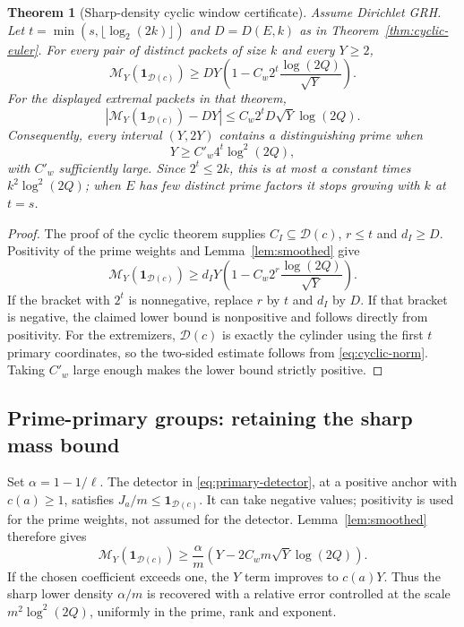 \documentclass[11pt]{article}
\newtheorem{theorem}{Theorem}[section]
\theoremstyle{definition}
\theoremstyle{remark}
\newcommand{\one}{\mathbf1}
\begin{document}
\begin{theorem}[Sharp-density cyclic window certificate]\label{thm:cyclic-window}
Assume Dirichlet GRH. Let $t=\min(s,\lfloor\log_2(2k)\rfloor)$ and $D=D(E,k)$ as in Theorem~\ref{thm:cyclic-euler}. For every pair of distinct packets of size $k$ and every $Y\ge2$,
\[
 \mathcal M_Y(\one_{\mathcal D(c)})
 \ge D Y\left(1-C_w2^t\frac{\log(2Q)}{\sqrt Y}\right).
\]
For the displayed extremal packets in that theorem,
\[
 \left|\mathcal M_Y(\one_{\mathcal D(c)})-DY\right|
 \le C_w2^tD\sqrt Y\log(2Q).
\]
Consequently, every interval $(Y,2Y)$ contains a distinguishing prime when
\[
 Y\ge C'_w4^t\log^2(2Q),
\]
with $C'_w$ sufficiently large. Since $2^t\le2k$, this is at most a constant times $k^2\log^2(2Q)$; when $E$ has few distinct prime factors it stops growing with $k$ at $t=s$.
\end{theorem}
\begin{proof}
The proof of the cyclic theorem supplies $C_I\subseteq\mathcal D(c)$, $r\le t$ and $d_I\ge D$. Positivity of the prime weights and Lemma~\ref{lem:smoothed} give
\[
 \mathcal M_Y(\one_{\mathcal D(c)})
 \ge d_IY\left(1-C_w2^r\frac{\log(2Q)}{\sqrt Y}\right).
\]
If the bracket with $2^t$ is nonnegative, replace $r$ by $t$ and $d_I$ by $D$. If that bracket is negative, the claimed lower bound is nonpositive and follows directly from positivity. For the extremizers, $\mathcal D(c)$ is exactly the cylinder using the first $t$ primary coordinates, so the two-sided estimate follows from \eqref{eq:cyclic-norm}. Taking $C'_w$ large enough makes the lower bound strictly positive.
\end{proof}

\subsection{Prime-primary groups: retaining the sharp mass bound}
Set $\alpha=1-1/\ell$. The detector in \eqref{eq:primary-detector}, at a positive anchor with $c(a)\ge1$, satisfies $J_a/m\le\one_{\mathcal D(c)}$. It can take negative values; positivity is used for the prime weights, not assumed for the detector. Lemma~\ref{lem:smoothed} therefore gives
\begin{equation}\label{eq:primary-window}
 \mathcal M_Y(\one_{\mathcal D(c)})
 \ge\frac{\alpha}{m}\left(Y-2C_wm\sqrt Y\log(2Q)\right).
\end{equation}
If the chosen coefficient exceeds one, the $Y$ term improves to $c(a)Y$. Thus the sharp lower density $\alpha/m$ is recovered with a relative error controlled at the scale $m^2\log^2(2Q)$, uniformly in the prime, rank and exponent.
\end{document}
